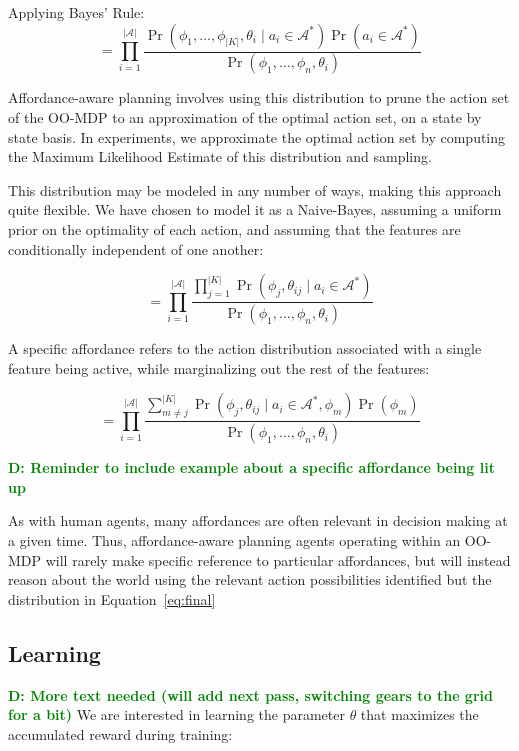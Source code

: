 \documentclass[conference]{IEEEtran}
\newcommand{\dnote}[1]{\textcolor{Green}{\textbf{D: #1}}}
\begin{document}
Applying Bayes' Rule:
\begin{equation}
= \prod_{i=1}^{|\mathcal{A}|} \frac{\Pr(\phi_1, \ldots, \phi_{|K|}, \theta_i \mid a_i \in \mathcal{A}^*) \Pr(a_i \in \mathcal{A}^*)}{\Pr(\phi_1, \ldots, \phi_n, \theta_i)}
\label{eq:bayes}
\end{equation}

Affordance-aware planning involves using this distribution to prune the action set of the OO-MDP
to an approximation of the optimal action set, on a state by state basis. In experiments, we approximate
the optimal action set by computing the Maximum Likelihood Estimate of this distribution and sampling.

This distribution may be modeled in any number of ways, making this approach quite flexible.
We have chosen to model it as a Naive-Bayes, assuming a uniform prior on the optimality of each action,
and assuming that the features are conditionally independent of one another:

\begin{equation}
= \prod_{i=1}^{|\mathcal{A}|} \frac{\prod_{j=1}^{|K|} \Pr(\phi_j, \theta_{ij} \mid a_i \in \mathcal{A}^*)}{\Pr(\phi_1, \ldots, \phi_n, \theta_i)}
\label{eq:final}
\end{equation}

A specific affordance refers to the action distribution associated with a single feature being active, while marginalizing out the rest of the features:

\begin{equation}
= \prod_{i=1}^{|\mathcal{A}|} \frac{\sum_{m\not=j}^{|K|} \Pr(\phi_j, \theta_{ij} \mid a_i \in \mathcal{A}^*, \phi_m) \Pr(\phi_m)}{\Pr(\phi_1, \ldots, \phi_n, \theta_i)}
\label{eq:posterior}
\end{equation}

\dnote{Reminder to include example about a specific affordance being lit up}

As with human agents, many affordances are often relevant in decision making at a given time.
Thus, affordance-aware planning agents operating within an OO-MDP will rarely make specific
reference to particular affordances, but will instead reason about the world using the relevant
action possibilities identified but the distribution in Equation~\ref{eq:final}

\subsection{Learning}
\dnote{More text needed (will add next pass, switching gears to the grid for a bit)}
We are interested in learning the parameter $\theta$ that maximizes the accumulated reward
during training:
\end{document}
